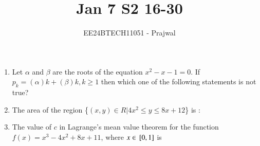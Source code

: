 \documentclass[journal,12pt,onecolumn]{IEEEtran}
\theoremstyle{remark}
\begin{document}

\vspace{3cm}

\title{Jan 7 S2 16-30}
\author{EE24BTECH11051 - Prajwal}
\maketitle

\bigskip

\renewcommand{\thefigure}{\theenumi}
\renewcommand{\thetable}{\theenumi}


\begin{enumerate}


\item Let $\alpha$ and $\beta$ are the roots of the equation $x^2-x-1=0$. If $p_k = (\alpha)k + (\beta)k, k\geq1$ then which one of the following statements is not true?
 \begin{enumerate}
\end{enumerate}


\item The area of the region \{$(x, y)\in R | 4x^2 \leq y \leq 8x + 12$\} is :
\begin{enumerate}
\end{enumerate}

\item The value of $c$ in Lagrange's mean value theorem for the function $f(x) = x^3-4x^2+8x+11$, where $x \in {}\left[0,1\right]$ is
\begin{enumerate}
\end{enumerate}


\end{enumerate}
\end{document}
